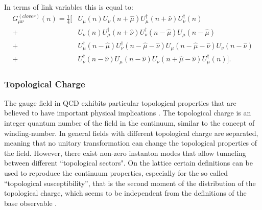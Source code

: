 In terms of link variables this is equal to:
\begin{align}
    G_{\mu\nu}^{(clover)}(n)=\frac{1}{4}\bigg[  &U_\mu(n)U_\nu(n+\hat\mu)U^\dagger_\mu(n+\hat\nu)U^\dagger_\nu(n)\\\nonumber
    + &U_\nu(n)U^\dagger_\mu(n+\hat\nu)U^\dagger_\nu(n-\hat\mu)U_\mu(n-\hat\mu)\\\nonumber
    + &U^\dagger_\mu(n-\hat\mu)U^\dagger_\nu(n-\hat\mu-\hat\nu)U_\mu(n-\hat\mu-\hat\nu)U_\nu(n-\hat\nu)\\\nonumber
    + &U^\dagger_\nu(n-\hat\nu)U_\mu(n-\hat\nu)U_\nu(n+\hat\mu-\hat\nu)U^\dagger_\mu(n) \bigg].
\end{align}
 

\subsubsection{Topological Charge}
The gauge field in QCD exhibits particular topological properties that are believed to have important physical implications \cite{witten_current_1979,di_giacomo_topology_1997}. The topological charge is an integer quantum number of the field in the continuum, similar to the concept of winding-number. In general fields with different topological charge are separated, meaning that no unitary transformation can change the topological properties of the field. However, there exist non-zero instanton modes \cite{schafer_instantons_1998} that allow tunneling between different ``topological sectors".
On the lattice certain definitions can be used to reproduce the continuum properties, especially for the so called ``topological susceptibility'', that is the second moment of the distribution of the topological charge, which seems to be independent from the definitions of the base observable \cite{alexandrou_comparison_2017,gross_qcd_1981}. 



